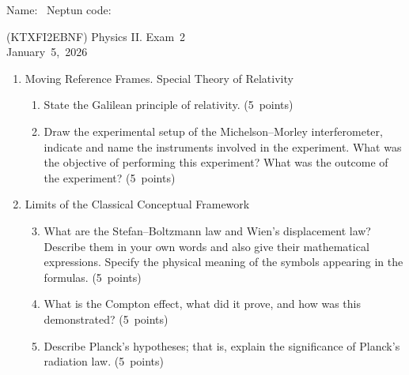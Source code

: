 \documentclass[a4paper,12pt]{letter}
\begin{document}
Name: \hrulefill\ Neptun code: \hrulefill

\bigskip

\begin{center}
(KTXFI2EBNF) Physics II. Exam~2 \\
January~5,~2026
\end{center}

\bigskip
 
\begin{enumerate}[label=\Roman*.]
   
\item Moving Reference Frames. Special Theory of Relativity

\begin{enumerate}[label=\arabic*.]
\setcounter{enumii}{0} %

\item State the Galilean principle of relativity. \hfill (5~points)

\item Draw the experimental setup of the Michelson–Morley interferometer, indicate and name the instruments involved in the experiment. What was the objective of performing this experiment? What was the outcome of the experiment? \hfill (5~points)

\end{enumerate}


\item Limits of the Classical Conceptual Framework

\begin{enumerate}[label=\arabic*.]
\setcounter{enumii}{2} %

\item What are the Stefan–Boltzmann law and Wien’s displacement law? Describe them in your own words and also give their mathematical expressions. Specify the physical meaning of the symbols appearing in the formulas. \hfill (5~points)
  
\item What is the Compton effect, what did it prove, and how was this demonstrated?  \hfill (5~points)

\item Describe Planck’s hypotheses; that is, explain the significance of Planck’s radiation law.  \hfill (5~points)

\end{enumerate}
  

\end{enumerate}
\end{document}
